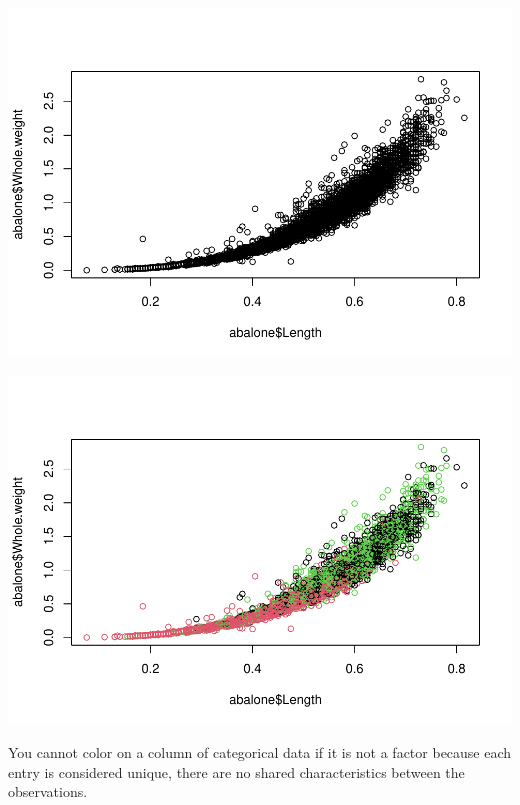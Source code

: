 \documentclass[
]{book}
\newenvironment{Shaded}{\begin{snugshade}}{\end{snugshade}}
\newcommand{\AttributeTok}[1]{\textcolor[rgb]{0.13,0.29,0.53}{#1}}
\newcommand{\FunctionTok}[1]{\textcolor[rgb]{0.13,0.29,0.53}{\textbf{#1}}}
\newcommand{\NormalTok}[1]{#1}
\newcommand{\SpecialCharTok}[1]{\textcolor[rgb]{0.81,0.36,0.00}{\textbf{#1}}}
\begin{document}
\includegraphics{_main_files/figure-latex/unnamed-chunk-35-1.pdf}

\begin{Shaded}
\end{Shaded}

\includegraphics{_main_files/figure-latex/unnamed-chunk-36-1.pdf}

You cannot color on a column of categorical data if it is not a factor because each entry is considered unique, there are no shared characteristics between the observations.
\end{document}
